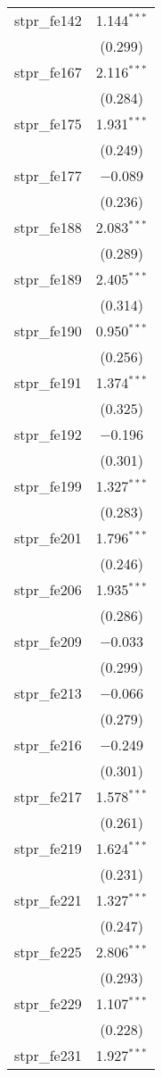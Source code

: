 \begin{table}[!htbp]
\begin{tabular}{@{\extracolsep{5pt}}lc}
  stpr\_fe142 & 1.144$^{***}$ \\ 
  & (0.299) \\ 
  stpr\_fe167 & 2.116$^{***}$ \\ 
  & (0.284) \\ 
  stpr\_fe175 & 1.931$^{***}$ \\ 
  & (0.249) \\ 
  stpr\_fe177 & $-$0.089 \\ 
  & (0.236) \\ 
  stpr\_fe188 & 2.083$^{***}$ \\ 
  & (0.289) \\ 
  stpr\_fe189 & 2.405$^{***}$ \\ 
  & (0.314) \\ 
  stpr\_fe190 & 0.950$^{***}$ \\ 
  & (0.256) \\ 
  stpr\_fe191 & 1.374$^{***}$ \\ 
  & (0.325) \\ 
  stpr\_fe192 & $-$0.196 \\ 
  & (0.301) \\ 
  stpr\_fe199 & 1.327$^{***}$ \\ 
  & (0.283) \\ 
  stpr\_fe201 & 1.796$^{***}$ \\ 
  & (0.246) \\ 
  stpr\_fe206 & 1.935$^{***}$ \\ 
  & (0.286) \\ 
  stpr\_fe209 & $-$0.033 \\ 
  & (0.299) \\ 
  stpr\_fe213 & $-$0.066 \\ 
  & (0.279) \\ 
  stpr\_fe216 & $-$0.249 \\ 
  & (0.301) \\ 
  stpr\_fe217 & 1.578$^{***}$ \\ 
  & (0.261) \\ 
  stpr\_fe219 & 1.624$^{***}$ \\ 
  & (0.231) \\ 
  stpr\_fe221 & 1.327$^{***}$ \\ 
  & (0.247) \\ 
  stpr\_fe225 & 2.806$^{***}$ \\ 
  & (0.293) \\ 
  stpr\_fe229 & 1.107$^{***}$ \\ 
  & (0.228) \\ 
  stpr\_fe231 & 1.927$^{***}$ \\ 

\end{tabular}
\end{table}
